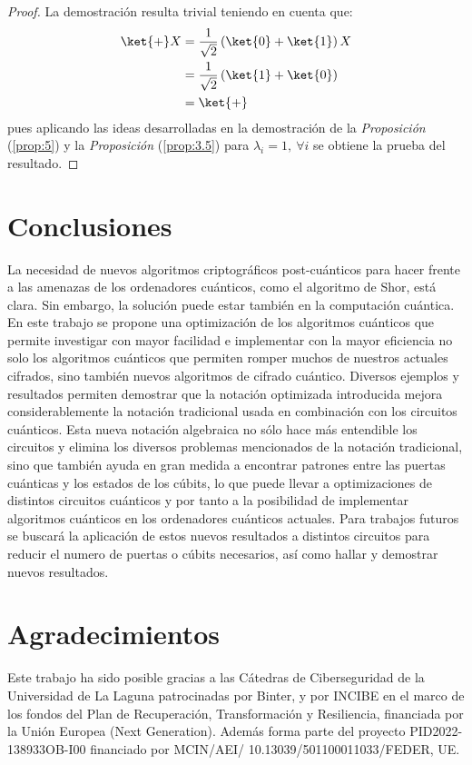 \documentclass[10pt,conference,a4paper]{IEEEtran}
\begin{document}
    \begin{proof}
        La demostración resulta trivial teniendo en cuenta que:
        \begin{align*}
            \ket{+}X&=\dfrac{1}{\sqrt{2}}\left(\ket{0}+\ket{1}\right)X\\
            &=\dfrac{1}{\sqrt{2}}\left(\ket{1}+\ket{0}\right)\\
            &=\ket{+}
        \end{align*}
        pues aplicando las ideas desarrolladas en la demostración de la \textit{Proposición} (\ref{prop:5}) y la \textit{Proposición} (\ref{prop:3.5}) para $\lambda_i=1,\ \forall i$ se obtiene la prueba del resultado.
    \end{proof}
    \section{Conclusiones}
    \label{seccion:6}
    La necesidad de nuevos algoritmos criptográficos post-cuánticos para hacer frente a las amenazas de los ordenadores cuánticos, como el algoritmo de Shor, está clara. Sin embargo, la solución puede estar también en la computación cuántica. En este  trabajo se propone una optimización de los algoritmos cuánticos que permite investigar con mayor facilidad e implementar con la mayor eficiencia no solo los algoritmos cuánticos que permiten romper muchos de nuestros actuales cifrados, sino también nuevos algoritmos de cifrado cuántico. Diversos ejemplos y resultados permiten demostrar que la notación optimizada introducida mejora considerablemente la notación tradicional usada en combinación con los circuitos cuánticos. Esta nueva notación algebraica no sólo hace más entendible los circuitos y elimina los diversos problemas mencionados de la notación tradicional, sino que también ayuda en gran medida a encontrar patrones entre las puertas cuánticas y los estados de los cúbits, lo que puede llevar a optimizaciones de distintos circuitos cuánticos y por tanto a la posibilidad de implementar algoritmos cuánticos en los ordenadores cuánticos actuales. Para trabajos futuros se buscará la aplicación de estos nuevos resultados a distintos circuitos para reducir el numero de puertas o cúbits necesarios, así como hallar y demostrar nuevos resultados.

    \section*{Agradecimientos}

    Este trabajo ha sido posible gracias a las Cátedras  de Ciberseguridad de la Universidad de La Laguna patrocinadas por Binter, y por INCIBE en el marco de los fondos del Plan de Recuperación, Transformación y Resiliencia, financiada por la Unión Europea (Next Generation). Además forma parte del proyecto PID2022-138933OB-I00 financiado  por MCIN/AEI/ 10.13039/501100011033/FEDER, UE.\\

    
    

\end{document}
